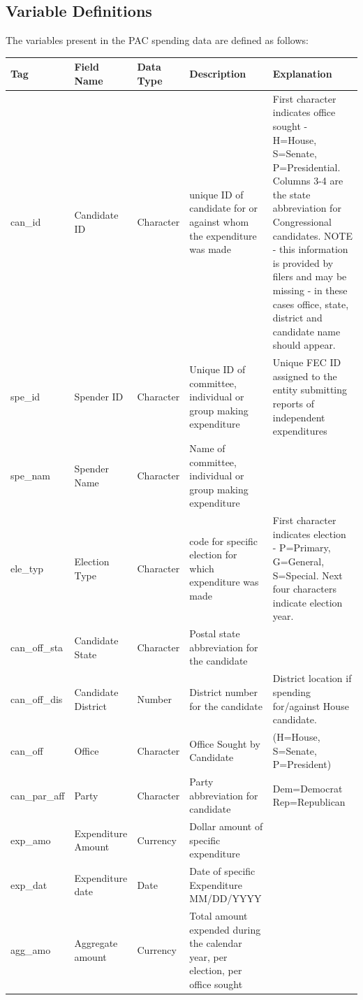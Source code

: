 \documentclass[11pt]{article}\usepackage{graphicx, color}
\begin{document}
\subsection{Variable Definitions}
The variables present in the PAC spending data are defined as follows:
\begin{landscape}
\begin{center}
\begin{longtable}[\textwidth]{l l l p{0.4\textheight} p{0.4\textheight}}
Tag & Field Name	& Data Type	& Description	& Explanation \\
\hline
can\_id  & Candidate ID  & Character &unique ID of candidate for or against whom the expenditure was made	& First character indicates office sought - H=House, S=Senate, P=Presidential. Columns 3-4 are the state abbreviation for Congressional candidates. NOTE - this information is provided by filers and may be missing - in these cases office, state, district and candidate name should appear. \\
spe\_id & Spender ID & Character & Unique ID of committee, individual or group making expenditure	&	Unique FEC ID assigned to the entity submitting reports of independent expenditures \\
spe\_nam & Spender Name &	Character &	Name of committee, individual or group making expenditure	& \\
ele\_typ & Election Type & Character & code for specific election for which expenditure was made & First character indicates election - P=Primary, G=General, S=Special. Next four characters indicate election year. \\
can\_off\_sta & Candidate State	& Character	& Postal state abbreviation for the candidate	& \\	 
can\_off\_dis &	Candidate District & Number &	District number for the candidate	&	District location if spending for/against House candidate.\\
can\_off & Office &	Character &	Office Sought by Candidate &	(H=House, S=Senate, P=President)\\
can\_par\_aff &	Party	& Character &	Party abbreviation for candidate & Dem=Democrat \newline Rep=Republican \\
exp\_amo & Expenditure Amount &	Currency & Dollar amount of specific expenditure & \\
exp\_dat &	Expenditure date &	Date	& Date of specific Expenditure	MM/DD/YYYY & \\	 
agg\_amo & Aggregate amount &	Currency &	Total amount expended during the calendar year, per election, per office sought & \\

\end{longtable}
\end{center}
\end{landscape}
\end{document}
